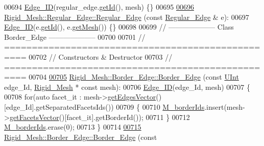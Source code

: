 \begin{DoxyCode}
00694     \hyperlink{classFVCode3D_1_1Rigid__Mesh_1_1Edge__ID}{Edge\_ID}(regular\_edge.\hyperlink{classFVCode3D_1_1Rigid__Mesh_1_1Edge__ID_af17ee26739dd0bb462a21a90c2c1e633}{getId}(), mesh) \{\}
00695 
\hypertarget{RigidMesh_8cpp_source.tex_l00696}{}\hyperlink{classFVCode3D_1_1Rigid__Mesh_1_1Regular__Edge_a95bc768eb796d743762452c898337f5f}{00696} \hyperlink{classFVCode3D_1_1Rigid__Mesh_1_1Regular__Edge_a92a9212ce948a5151320a4a29be3218d}{Rigid\_Mesh::Regular\_Edge::Regular\_Edge} (\textcolor{keyword}{const} 
      \hyperlink{classFVCode3D_1_1Rigid__Mesh_1_1Regular__Edge}{Regular\_Edge} & e):
00697     \hyperlink{classFVCode3D_1_1Rigid__Mesh_1_1Edge__ID}{Edge\_ID}(e.\hyperlink{classFVCode3D_1_1Rigid__Mesh_1_1Edge__ID_af17ee26739dd0bb462a21a90c2c1e633}{getId}(), e.\hyperlink{classFVCode3D_1_1Rigid__Mesh_1_1Edge__ID_a197a8049cfb5e26c077f668ffb49e6eb}{getMesh}()) \{\}
00698 
00699 \textcolor{comment}{// --------------------   Class Border\_Edge   --------------------}
00700 
00701 \textcolor{comment}{// ==================================================}
00702 \textcolor{comment}{// Constructors & Destructor}
00703 \textcolor{comment}{// ==================================================}
00704 
\hypertarget{RigidMesh_8cpp_source.tex_l00705}{}\hyperlink{classFVCode3D_1_1Rigid__Mesh_1_1Border__Edge_a610aa0369df57087614115aa44bafc25}{00705} \hyperlink{classFVCode3D_1_1Rigid__Mesh_1_1Border__Edge_a610aa0369df57087614115aa44bafc25}{Rigid\_Mesh::Border\_Edge::Border\_Edge} (\textcolor{keyword}{const} 
      \hyperlink{namespaceFVCode3D_a4bf7e328c75d0fd504050d040ebe9eda}{UInt} edge\_Id, \hyperlink{classFVCode3D_1_1Rigid__Mesh}{Rigid\_Mesh} * \textcolor{keyword}{const} mesh):
00706     \hyperlink{classFVCode3D_1_1Rigid__Mesh_1_1Edge__ID}{Edge\_ID}(edge\_Id, mesh)
00707 \{
00708     \textcolor{keywordflow}{for}(\textcolor{keyword}{auto} facet\_it : mesh->\hyperlink{classFVCode3D_1_1Rigid__Mesh_a807a6932cb5b80eb73bf86c3dae06a80}{getEdgesVector}()[edge\_Id].getSeparatedFacetsIds())
00709     \{
00710         \hyperlink{classFVCode3D_1_1Rigid__Mesh_1_1Border__Edge_a2dae62d2ca3357296618f45f5a58e81e}{M\_borderIds}.insert(mesh->\hyperlink{classFVCode3D_1_1Rigid__Mesh_a6d3cdd4ef8a5225599953179d5302636}{getFacetsVector}()[facet\_it].getBorderId());
00711     \}
00712     \hyperlink{classFVCode3D_1_1Rigid__Mesh_1_1Border__Edge_a2dae62d2ca3357296618f45f5a58e81e}{M\_borderIds}.erase(0);
00713 \}
00714 
\hypertarget{RigidMesh_8cpp_source.tex_l00715}{}\hyperlink{classFVCode3D_1_1Rigid__Mesh_1_1Border__Edge_a4c84ed48d5ade111d258cad7e6a32d79}{00715} \hyperlink{classFVCode3D_1_1Rigid__Mesh_1_1Border__Edge_a610aa0369df57087614115aa44bafc25}{Rigid\_Mesh::Border\_Edge::Border\_Edge} (\textcolor{keyword}{const} 

\end{DoxyCode}
